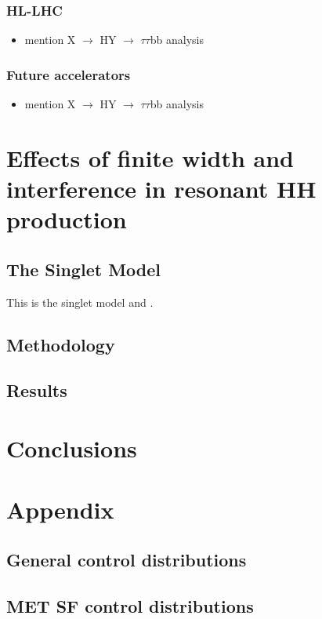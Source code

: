 \documentclass[11pt]{article}
\newcommand{\reshybbtt}{X $\rightarrow$ HY $\rightarrow$ $\tau\tau$bb}
\begin{document}
\subsubsection{HL-LHC}
\label{sec:orge767f18}
\begin{itemize}
\item mention \reshybbtt{} analysis
\end{itemize}
\subsubsection{Future accelerators}
\label{sec:orgf2ac908}
\begin{itemize}
\item mention \reshybbtt{} analysis
\end{itemize}

\section{Effects of finite width and interference in resonant HH production}
\label{sec:org77bef73}
\subsection{The Singlet Model}
\label{sec:org858f66e}
\label{sec::SingletModel}

This is the singlet model \cite{jona_soutenance} and \cite{hgcal_tdr}.
\subsection{Methodology}
\label{sec:org8877ab8}
\subsection{Results}
\label{sec:org562987f}


\section{Conclusions}
\label{sec:orga91ec2a}


\section{Appendix}
\label{sec:org4015eb3}
\subsection{General control distributions}
\label{sec:orgfdbe94f}
\subsection{MET SF control distributions}
\label{sec:org66fc936}
\end{document}
